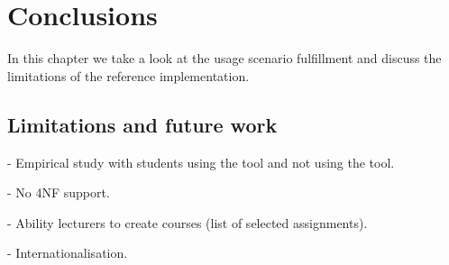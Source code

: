 \chapter{Conclusions}
\label{chap:conclusion}
In this chapter we take a look at the usage scenario fulfillment and discuss the limitations of the reference implementation.

\section{Limitations and future work}
- Empirical study with students using the tool and not using the tool.

- No 4NF support.

- Ability lecturers to create courses (list of selected assignments).

- Internationalisation.
